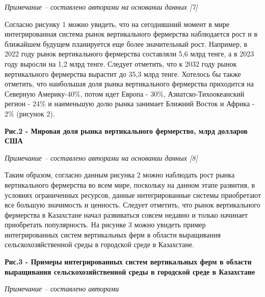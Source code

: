 \emph{Примечание -- составлено авторами на основании данных {[}7{]}}

Согласно рисунку 1 можно увидеть, что на сегодняшний момент в мире
интегрированная система рынок вертикального фермерства наблюдается рост
и в ближайшем будущем планируется еще более значительный рост. Например,
в 2022 году рынок вертикального фермерства составляли 5,6 млрд тенге, а
в 2023 году выросли на 1,2 млрд тенге. Следует отметить, что к 2032 году
рынок вертикального фермерства вырастит до 35,3 млрд тенге. Хотелось бы
также отметить, что наибольшая доля рынка вертикального фермерства
приходится на Северную Америку-40\%, потом идет Европа - 30\%,
Азиатско-Тихоокеанский регион - 24\% и наименьшую долю рынка занимает
Ближний Восток и Африка - 2\% (рисунок 2).

{\bfseries Рис.2 - Мировая доля рынка вертикального фермерство, млрд
долларов США}

\emph{Примечание -- составлено авторами на основании данных {[}8{]}}

Таким образом, согласно данным рисунка 2 можно наблюдать рост рынка
вертикального фермерства во всем мире, поскольку на данном этапе
развития, в условиях ограниченных ресурсов, данные интегрированные
системы приобретают все большую значимость и ценность. Следует отметить,
что рынок вертикального фермерства в Казахстане начал развиваться совсем
недавно и только начинает приобретать популярность. На рисунке 3 можно
увидеть пример интегрированных систем вертикальных ферм в области
выращивания сельскохозяйственной среды в городской среде в Казахстане.


{\bfseries Рис.3 - Примеры} {\bfseries интегрированных систем вертикальных
ферм в области выращивания сельскохозяйственной среды в городской среде
в Казахстане}

\emph{Примечание -- составлено авторами}

